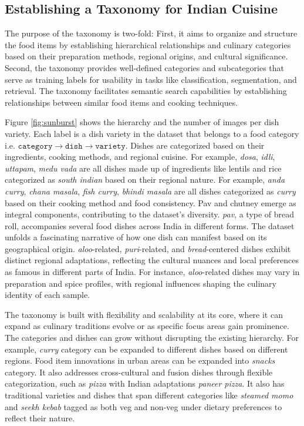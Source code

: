 \documentclass{article}
\begin{document}
\subsection{Establishing a Taxonomy for Indian Cuisine}
\label{subsec:data-taxo}

The purpose of the taxonomy is two-fold: First, it aims to organize and structure the food items by establishing hierarchical relationships and culinary categories based on their preparation methods, regional origins, and cultural significance. Second, the taxonomy provides well-defined categories and subcategories that serve as training labels for usability in tasks like classification, segmentation, and retrieval. The taxonomy facilitates semantic search capabilities by establishing relationships between similar food items and cooking techniques.

Figure \ref{fig:sunburst} shows the hierarchy and the number of images per dish variety. Each label is a dish variety in the dataset that belongs to a food category i.e. $\texttt{category} \rightarrow \texttt{dish} \rightarrow \texttt{variety}$. Dishes are categorized based on their ingredients, cooking methods, and regional cuisine. For example, \textit{dosa}, \textit{idli}, \textit{uttapam}, \textit{medu vada} are all dishes made up of ingredients like lentils and rice categorized as \textit{south indian} based on their regional nature. For example, \textit{anda curry}, \textit{chana masala}, \textit{fish curry}, \textit{bhindi masala} are all dishes categorized as \textit{curry} based on their cooking method and food consistency. Pav and chutney emerge as integral components, contributing to the dataset’s diversity. \textit{pav}, a type of bread roll, accompanies several food dishes across India in different forms. The dataset unfolds a fascinating narrative of how one dish can manifest based on its geographical origin. \textit{aloo}-related, \textit{puri}-related, and \textit{bread}-centered dishes exhibit distinct regional adaptations, reflecting the cultural nuances and local preferences as famous in different parts of India. For instance, \textit{aloo}-related dishes may vary in preparation and spice profiles, with regional influences shaping the culinary identity of each sample.

The taxonomy is built with flexibility and scalability at its core, where it can expand as culinary traditions evolve or as specific focus areas gain prominence. The categories and dishes can grow without disrupting the existing hierarchy. For example, \textit{curry} category can be expanded to different dishes based on different regions. Food item innovations in urban areas can be expanded into \textit{snacks} category. It also addresses cross-cultural and fusion dishes through flexible categorization, such as \textit{pizza} with Indian adaptations \textit{paneer pizza}. It also has traditional varieties and dishes that span different categories like \textit{steamed momo} and \textit{seekh kebab} tagged as both veg and non-veg under dietary preferences to reflect their nature.
\end{document}
